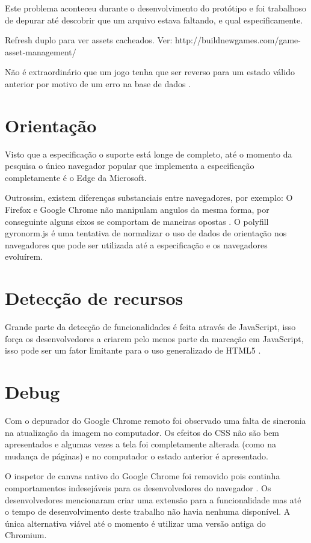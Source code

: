 Este problema aconteceu durante o desenvolvimento do protótipo e
foi trabalhoso de depurar até descobrir que um arquivo estava faltando, e qual
especificamente.

Refresh duplo para ver assets cacheados. Ver:
http://buildnewgames.com/game-asset-management/

Não é extraordinário que um jogo tenha que ser reverso para um estado
válido anterior por motivo de um erro na base de dados \autocite[pp.
5]{browserGamesTechnologyAndFuture}.

\section{Orientação}

Visto que a especificação o suporte está longe de completo, até
o momento da pesquisa o único navegador popular que implementa a
especificação completamente é o Edge da Microsoft.

Outrossim, existem diferenças substanciais entre navegadores, por
exemplo: O Firefox e Google Chrome não manipulam angulos da mesma
forma, por conseguinte alguns eixos se comportam de maneiras opostas
\autocite{mdnOrientation}. O polyfill gyronorm.js é uma tentativa de
normalizar o uso de dados de orientação nos navegadores que pode ser
utilizada até a especificação e os navegadores evoluírem.

\section{Detecção de recursos}

Grande parte da detecção de funcionalidades é feita através de
JavaScript, isso força os desenvolvedores a criarem pelo menos parte da
marcação em JavaScript, isso pode ser um fator limitante para o uso
generalizado de HTML5 \autocite{diveIntohtml}.

\section{Debug}

Com o depurador do Google Chrome remoto foi observado uma falta de
sincronia na atualização da imagem no computador. Os efeitos do CSS
não são bem apresentados e algumas vezes a tela foi completamente
alterada (como na mudança de páginas) e no computador o estado
anterior é apresentado.

O inspetor de canvas nativo do Google Chrome foi removido pois continha
comportamentos indesejáveis para os desenvolvedores do navegador
\autocite{canvasinspector}. Os desenvolvedores mencionaram criar uma
extensão para a funcionalidade mas até o tempo de desenvolvimento
deste trabalho não havia nenhuma disponível. A única alternativa
viável até o momento é utilizar uma versão antiga do Chromium.

